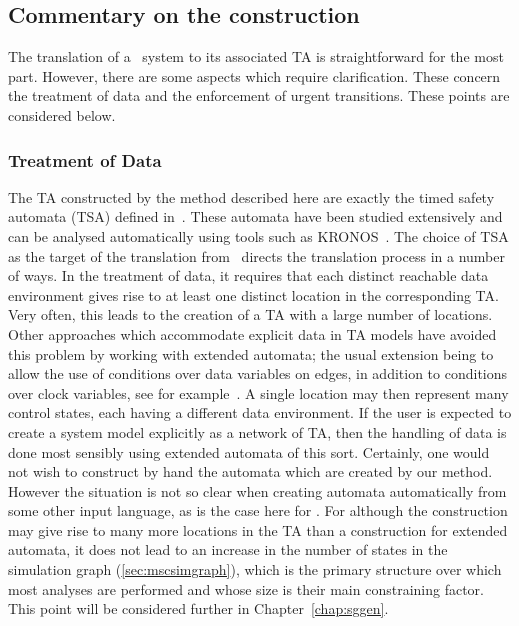 \subsection{Commentary on the construction}\label{ss:tgcomments}
The translation of a \bcandle\ system to its associated TA is
straightforward for the most part. However, there are some aspects
which require clarification. These concern the treatment of data and
the enforcement of urgent transitions. These points are considered below.

\subsubsection{Treatment of Data}
The TA constructed by the method described here are exactly the timed
safety automata (TSA) defined in~\cite{hnsy:94}. These automata have
been studied extensively and can be analysed automatically using tools
such as \break KRONOS~\cite{bdm:98}. The choice of TSA as the target of the
translation from \bcandle\ directs the translation process in a number
of ways.  In the treatment of data, it requires that each distinct
reachable data environment gives rise to at least one distinct
location in the corresponding TA. Very often, this leads to the
creation of a TA with a large number of locations. Other approaches
which accommodate explicit data in TA models have avoided this problem
by working with extended automata; the usual extension being to allow
the use of conditions over data variables on edges, in addition to
conditions over clock variables, see for
example~\cite{tri:98,her:98,bll:98,blt:99}. A single location may then
represent many control states, each having a different data
environment.  If the user is expected to create a system model
explicitly as a network of TA, then the handling of data is done most
sensibly using extended automata of this sort. Certainly, one would
not wish to construct by hand the automata which are created by our
method.  However the situation is not so clear when creating automata
automatically from some other input language, as is the case here for
\bcandle. For although the construction may give rise to many more
locations in the TA than a construction for extended automata, it does
not lead to an increase in the number of states in the simulation
graph (\Sec\ref{sec:mscsimgraph}), which is the primary structure over
which most analyses are performed and whose size is their main
constraining factor.  This point will be considered further in
Chapter~\ref{chap:sggen}.
 
